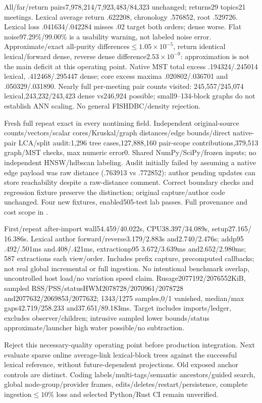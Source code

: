 \documentclass[11pt]{article}
\begin{document}
All/far/return pairs7,978,214/7,923,483/84,323 unchanged; returns29 topics21
meetings. Lexical average return .622208, chronology .576852, root .529726.
Lexical loss .041634/.042284 misses .02 target both orders; dense worse.
Flat noise97.29\%/99.00\% is a usability warning, not labeled noise error.
Approximate/exact all-purity differences$\le1.05\times10^{-5}$, return identical
lexical/forward dense, reverse dense difference$2.53\times10^{-9}$: approximation
is not the main deficit at this operating point. Native MST total excess
.194324/.245014 lexical, .412468/.295447 dense; core excess maxima
.020802/.036701 and .050329/.031890. Nearly full per-meeting pair counts visited:
245,557/245,074 lexical,243,232/243,423 dense vs246,924 possible; small9--134-block
graphs do not establish ANN scaling. No general FISHDBC/density rejection.

Fresh full repeat exact in every nontiming field. Independent original-source
counts/vectors/scalar cores/Kruskal/graph distances/edge bounds/direct native-pair
LCA/split audit:1,296 tree cases,127,888,160 pair-scope contributions,379,513
graph/MST checks, max numeric error0. Shared NumPy/SciPy/frozen inputs; no
independent HNSW/hdbscan labeling. Audit initially failed by assuming a native
edge payload was raw distance (.763913 vs .772852): author pending updates can
store reachability despite a raw-distance comment. Correct boundary checks and
regression fixture preserve the distinction; original capture/author code
unchanged. Four new fixtures, enabled505-test lab passes. Full provenance and
cost scope in .

First/repeat after-import wall54.459/40.022s, CPU38.397/34.089s, setup27.165/
16.386s. Lexical author forward/reverse3.179/2.883s and2.740/2.476s; addp95
.492/.501ms and.408/.421ms, extractionp95 3.672/3.639ms and2.652/2.980ms;
587 extractions each view/order. Includes prefix capture, precomputed callbacks;
not real global incremental or full ingestion. No intentional benchmark overlap,
uncontrolled host load/no variation speed claim. Rusage2077192/2076552KiB,
sampled RSS/PSS/statusHWM2078728/2070961/2078728 and2077632/2069853/2077632;
1343/1275 samples,0/1 vanished, median/max gaps42.719/258.233 and37.651/89.183ms.
Target includes imports/ledger, excludes observer/children; intrusive sampled
lower bounds/status approximate/launcher high water possible/no subtraction.

Reject this necessary-quality operating point before production integration.
Next evaluate sparse online average-link lexical-block trees against the
successful lexical reference, without future-dependent projections. Old exposed
anchor controls are distinct. Coding labels/multi-tags/semantic ancestors/guided
search, global node-group/provider frames, edits/deletes/restart/persistence,
complete ingestion$\le10\%$ loss and selected Python/Rust CI remain unverified.
\end{document}
